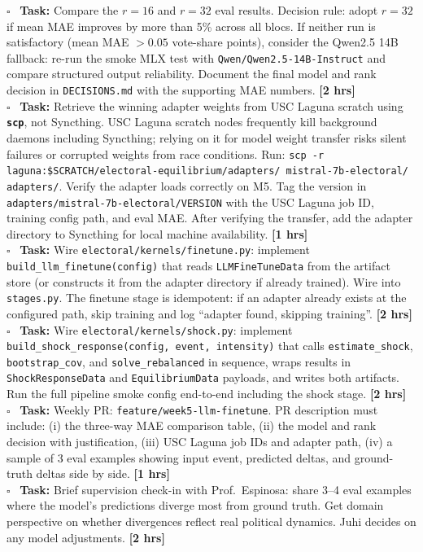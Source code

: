 \documentclass[11pt]{article}
\newcommand{\hrs}[1]{\textbf{[#1 hrs]}}
\newcommand{\task}[2]{%
  \noindent\textbf{Task:} #1 \hfill \hrs{#2}\\}
\newcommand{\done}{\textcolor{sectionblue}{$\square$}\ }
\begin{document}
\begin{taskbox}
\done \task{Compare the $r=16$ and $r=32$ eval results. Decision rule: adopt
  $r=32$ if mean MAE improves by more than 5\% across all blocs. If neither
  run is satisfactory (mean MAE $> 0.05$ vote-share points), consider the
  Qwen2.5 14B fallback: re-run the smoke MLX test with
  \texttt{Qwen/Qwen2.5-14B-Instruct} and compare structured output reliability.
  Document the final model and rank decision in \texttt{DECISIONS.md} with
  the supporting MAE numbers.}{2}

\done \task{Retrieve the winning adapter weights from USC Laguna scratch using
  \textbf{\texttt{scp}}, not Syncthing. USC Laguna scratch nodes frequently kill
  background daemons including Syncthing; relying on it for model weight
  transfer risks silent failures or corrupted weights from race conditions.
  Run: \texttt{scp -r laguna:\$SCRATCH/electoral-equilibrium/adapters/
  mistral-7b-electoral/ adapters/}. Verify the adapter loads correctly on M5.
  Tag the version in \texttt{adapters/mistral-7b-electoral/VERSION} with the
  USC Laguna job ID, training config path, and eval MAE. After verifying the
  transfer, add the adapter directory to Syncthing for local machine availability.}{1}

\done \task{Wire \texttt{electoral/kernels/finetune.py}: implement
  \texttt{build\_llm\_finetune(config)} that reads \texttt{LLMFineTuneData}
  from the artifact store (or constructs it from the adapter directory if
  already trained). Wire into \texttt{stages.py}. The finetune stage is
  idempotent: if an adapter already exists at the configured path, skip
  training and log ``adapter found, skipping training''.}{2}

\done \task{Wire \texttt{electoral/kernels/shock.py}: implement
  \texttt{build\_shock\_response(config, event, intensity)} that calls
  \texttt{estimate\_shock}, \texttt{bootstrap\_cov}, and
  \texttt{solve\_rebalanced} in sequence, wraps results in
  \texttt{ShockResponseData} and \texttt{EquilibriumData} payloads, and
  writes both artifacts. Run the full pipeline smoke config end-to-end
  including the shock stage.}{2}

\done \task{Weekly PR: \texttt{feature/week5-llm-finetune}. PR description must
  include: (i) the three-way MAE comparison table, (ii) the model and rank
  decision with justification, (iii) USC Laguna job IDs and adapter path, (iv)
  a sample of 3 eval examples showing input event, predicted deltas, and
  ground-truth deltas side by side.}{1}

\done \task{Brief supervision check-in with Prof.\ Espinosa: share 3--4 eval
  examples where the model's predictions diverge most from ground truth.
  Get domain perspective on whether divergences reflect real political
  dynamics. Juhi decides on any model adjustments.}{2}
\end{taskbox}
\end{document}

